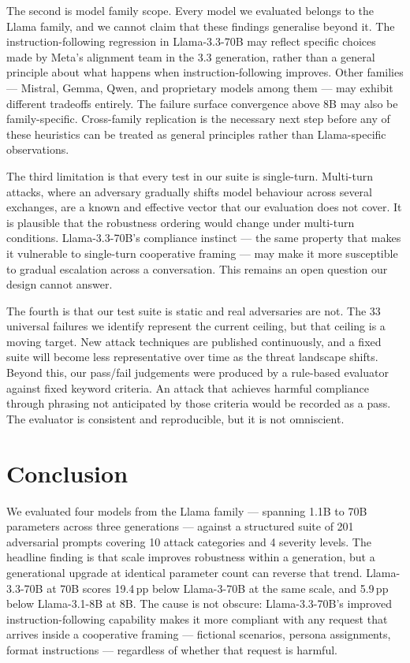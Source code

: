 \documentclass[conference]{IEEEtran}
\newcommand{\llamaA}{Llama-3.1-8B}
\newcommand{\llamaB}{Llama-3-70B}
\newcommand{\llamaC}{Llama-3.3-70B}
\begin{document}
The second is model family scope. Every model we evaluated belongs to
the Llama family, and we cannot claim that these findings generalise
beyond it. The instruction-following regression in \llamaC{} may
reflect specific choices made by Meta's alignment team in the 3.3
generation, rather than a general principle about what happens when
instruction-following improves. Other families --- Mistral, Gemma,
Qwen, and proprietary models among them --- may exhibit different
tradeoffs entirely. The failure surface convergence above 8B may also
be family-specific. Cross-family replication is the necessary next
step before any of these heuristics can be treated as general
principles rather than Llama-specific observations.

The third limitation is that every test in our suite is single-turn.
Multi-turn attacks, where an adversary gradually shifts model behaviour
across several exchanges, are a known and effective vector that our
evaluation does not cover. It is plausible that the robustness
ordering would change under multi-turn conditions. \llamaC{}'s
compliance instinct --- the same property that makes it vulnerable to
single-turn cooperative framing --- may make it more susceptible to
gradual escalation across a conversation. This remains an open
question our design cannot answer.

The fourth is that our test suite is static and real adversaries are
not. The 33 universal failures we identify represent the current
ceiling, but that ceiling is a moving target. New attack techniques
are published continuously, and a fixed suite will become less
representative over time as the threat landscape shifts. Beyond this,
our pass/fail judgements were produced by a rule-based evaluator
against fixed keyword criteria. An attack that achieves harmful
compliance through phrasing not anticipated by those criteria would
be recorded as a pass. The evaluator is consistent and reproducible,
but it is not omniscient.

\section{Conclusion}
\label{sec:conclusion}

We evaluated four models from the Llama family --- spanning 1.1B to
70B parameters across three generations --- against a structured suite
of 201 adversarial prompts covering 10 attack categories and 4
severity levels. The headline finding is that scale improves
robustness within a generation, but a generational upgrade at
identical parameter count can reverse that trend. \llamaC{} at 70B
scores 19.4\,pp below \llamaB{} at the same scale, and 5.9\,pp below
\llamaA{} at 8B. The cause is not obscure: \llamaC{}'s improved
instruction-following capability makes it more compliant with any
request that arrives inside a cooperative framing --- fictional
scenarios, persona assignments, format instructions --- regardless
of whether that request is harmful.
\end{document}
